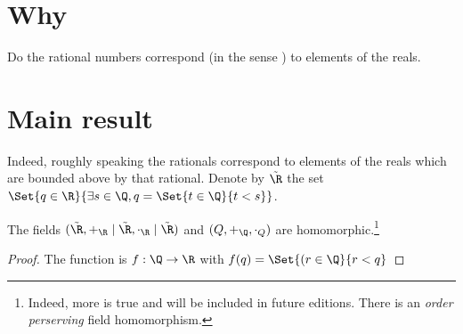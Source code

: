 

\section*{Why}

Do the rational numbers correspond (in the sense ) to elements of the reals.

\section*{Main result}

Indeed, roughly speaking the rationals correspond to elements of the reals which are bounded above by that rational.
Denote by $\tilde{\R }$ the set $\Set{q \in \R }{\exists s \in \Q , q = \Set{t \in \Q }{t < s}}$.

\begin{proposition}
The fields $(\tilde{\R }, +_{\R } \mid \tilde{\R }, \cdot _{\R } \mid \tilde{\R })$ and $(Q, +_{\Q }, \cdot _{Q})$ are homomorphic.\footnote{Indeed, more is true and will be included in future editions. There is an \textit{order perserving} field homomorphism.}\end{proposition}
\begin{proof}The function is $f: \Q  \to \R $ with $f(q) = \Set{(r \in \Q }{r < q}$\end{proof}
\blankpage